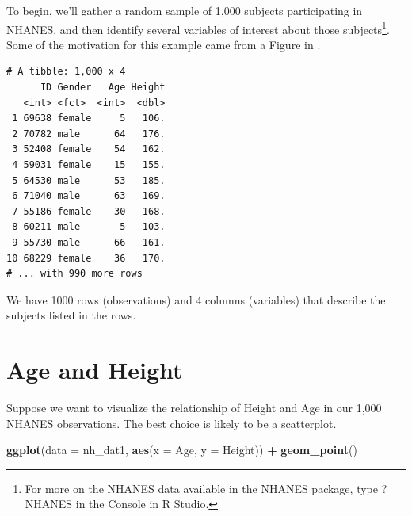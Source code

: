 \documentclass[
]{book}
\newenvironment{Shaded}{\begin{snugshade}}{\end{snugshade}}
\newcommand{\CommentTok}[1]{\textcolor[rgb]{0.56,0.35,0.01}{\textit{#1}}}
\newcommand{\DataTypeTok}[1]{\textcolor[rgb]{0.13,0.29,0.53}{#1}}
\newcommand{\DecValTok}[1]{\textcolor[rgb]{0.00,0.00,0.81}{#1}}
\newcommand{\KeywordTok}[1]{\textcolor[rgb]{0.13,0.29,0.53}{\textbf{#1}}}
\newcommand{\NormalTok}[1]{#1}
\newcommand{\OperatorTok}[1]{\textcolor[rgb]{0.81,0.36,0.00}{\textbf{#1}}}
\newcommand{\StringTok}[1]{\textcolor[rgb]{0.31,0.60,0.02}{#1}}
\begin{document}
To begin, we'll gather a random sample of 1,000 subjects participating in NHANES, and then identify several variables of interest about those subjects\footnote{For more on the NHANES data available in the NHANES package, type ?NHANES in the Console in R Studio.}. Some of the motivation for this example came from a Figure in \citet{BaumerKaplanHorton}.

\begin{Shaded}
\end{Shaded}

\begin{verbatim}
# A tibble: 1,000 x 4
      ID Gender   Age Height
   <int> <fct>  <int>  <dbl>
 1 69638 female     5   106.
 2 70782 male      64   176.
 3 52408 female    54   162.
 4 59031 female    15   155.
 5 64530 male      53   185.
 6 71040 male      63   169.
 7 55186 female    30   168.
 8 60211 male       5   103.
 9 55730 male      66   161.
10 68229 female    36   170.
# ... with 990 more rows
\end{verbatim}

We have 1000 rows (observations) and 4 columns (variables) that describe the subjects listed in the rows.

\hypertarget{age-and-height}{%
\section{Age and Height}\label{age-and-height}}

Suppose we want to visualize the relationship of Height and Age in our 1,000 NHANES observations. The best choice is likely to be a scatterplot.

\begin{Shaded}
\begin{Highlighting}[]
\KeywordTok{ggplot}\NormalTok{(}\DataTypeTok{data =}\NormalTok{ nh_dat1, }\KeywordTok{aes}\NormalTok{(}\DataTypeTok{x =}\NormalTok{ Age, }\DataTypeTok{y =}\NormalTok{ Height)) }\OperatorTok{+}
\StringTok{    }\KeywordTok{geom_point}\NormalTok{()}
\end{Highlighting}
\end{Shaded}
\end{document}
